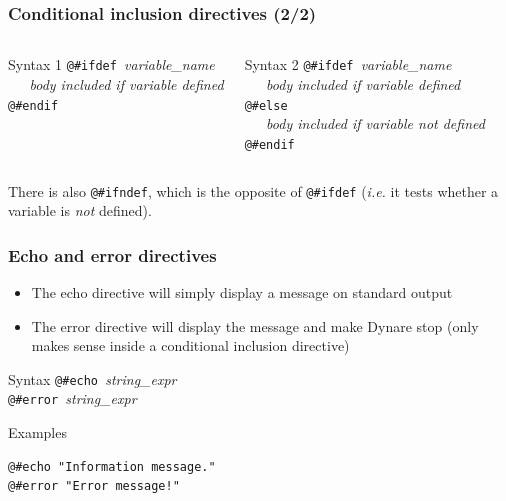 \documentclass{beamer}
\begin{document}
\begin{frame}[fragile=singleslide]
  \frametitle{Conditional inclusion directives (2/2)}

  \begin{columns}[T]
    \begin{block}{Syntax 1}
\verb+@#ifdef +\textit{variable\_name} \\
\verb+   +\textit{body included if variable defined} \\
\verb+@#endif+
    \end{block}

    \begin{block}{Syntax 2}
\verb+@#ifdef +\textit{variable\_name} \\
\verb+   +\textit{body included if variable defined} \\
\verb+@#else+ \\
\verb+   +\textit{body included if variable not defined} \\
\verb+@#endif+
    \end{block}
  \end{columns}

\bigskip

There is also \verb+@#ifndef+, which is the opposite of \verb+@#ifdef+
(\textit{i.e.} it tests whether a variable is \emph{not} defined).
\end{frame}

\begin{frame}[fragile=singleslide]
  \frametitle{Echo and error directives}

  \begin{itemize}
  \item The echo directive will simply display a message on standard output
  \item The error directive will display the message and make Dynare stop (only makes sense inside a conditional inclusion directive)
  \end{itemize}

  \begin{block}{Syntax}
\verb+@#echo +\textit{string\_expr} \\
\verb+@#error +\textit{string\_expr}
  \end{block}

  \begin{block}{Examples}
\begin{verbatim}
@#echo "Information message."
@#error "Error message!"
\end{verbatim}
  \end{block}
\end{frame}
\end{document}
